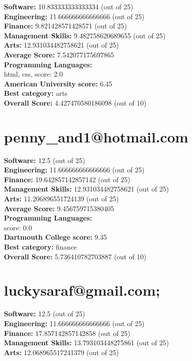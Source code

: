 \documentclass{article}
\begin{document}
\textbf{Software:} 10.833333333333334 (out of 25)\\
\textbf{Engineering: } 11.666666666666666 (out of 25)\\
\textbf{Finance:} 9.821428571428571 (out of 25)\\
\textbf{Management Skills:} 9.482758620689655 (out of 25)\\
\textbf{Arts:} 12.931034482758621 (out of 25)\\
\textbf{Average Score: } 7.542077175697865\\
\textbf{Programming Languages:} \\
html, css, score: 2.0\\
\textbf{American University} \textbf{score:} 6.45\\
\textbf{Best category: } arts\\
\textbf{Overall Score: }4.427470580186098 (out of 10)\section{penny_and1@hotmail.com}
\textbf{Software:} 12.5 (out of 25)\\
\textbf{Engineering: } 11.666666666666666 (out of 25)\\
\textbf{Finance:} 19.642857142857142 (out of 25)\\
\textbf{Management Skills:} 12.931034482758621 (out of 25)\\
\textbf{Arts:} 11.206896551724139 (out of 25)\\
\textbf{Average Score: } 9.456759715380405\\
\textbf{Programming Languages:} \\
score: 0.0\\
\textbf{Dartmouth College} \textbf{score:} 9.35\\
\textbf{Best category: } finance\\
\textbf{Overall Score: }5.736410782703887 (out of 10)\section{luckysaraf@gmail.com;}
\textbf{Software:} 12.5 (out of 25)\\
\textbf{Engineering: } 11.666666666666666 (out of 25)\\
\textbf{Finance:} 17.857142857142858 (out of 25)\\
\textbf{Management Skills:} 13.793103448275861 (out of 25)\\
\textbf{Arts:} 12.068965517241379 (out of 25)\\
\end{document}
